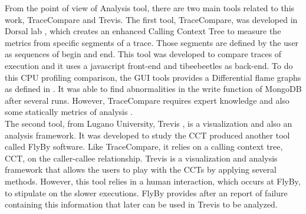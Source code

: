 From the point of view of Analysis tool, there are two main tools related to this work, TraceCompare and Trevis.
The first tool, TraceCompare, was developed in Dorsal lab \cite{tracecompare}, which creates an enhanced Calling Context Tree to measure the metrics from specific segments of a trace. Those segments are defined by the user as sequences of begin and end. This tool was developed to compare traces of execution and it uses a javascript front-end and tibeebeetles as back-end. To do this CPU profiling comparison, the GUI tools provides a Differential flame graphs as defined in \cite{differential_flame}.
 It was able to find abnormalities in the write function of MongoDB after several runs. However, TraceCompare requires expert knowledge and also some statically metrics of analysis \cite{doray_thesis}.\\
 
The second tool, from Lugano University, Trevis \cite{trevis}, is a visualization and also an analysis framework. It was developed to study the CCT produced another tool called FlyBy software. Like TraceCompare, it relies on a calling context tree, CCT, on the caller-callee relationship. Trevis is a visualization and analysis framework that 
allows the users to play with the CCTs by applying several methods.
However, this tool relies in a human interaction, which occurs at FlyBy, to stipulate on the slower executions. FlyBy provides after an report of failure containing this information that later can be used in Trevis to be analyzed.\\

